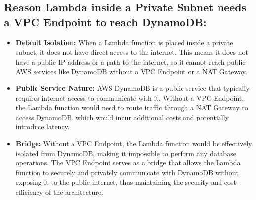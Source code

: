 \subsection{Reason Lambda inside a Private Subnet needs a VPC Endpoint to reach DynamoDB:}
\begin{itemize}
  \item \textbf{Default Isolation:} When a Lambda function is placed inside a private subnet, it does not have direct access to the internet. This means it does not have a public IP address or a path to the internet, so it cannot reach public AWS services like DynamoDB without a VPC Endpoint or a NAT Gateway.
  \item \textbf{Public Service Nature:} AWS DynamoDB is a public service that typically requires internet access to communicate with it. Without a VPC Endpoint, the Lambda function would need to route traffic through a NAT Gateway to access DynamoDB, which would incur additional costs and potentially introduce latency.
  \item \textbf{Bridge:} Without a VPC Endpoint, the Lambda function would be effectively isolated from DynamoDB, making it impossible to perform any database operations. The VPC Endpoint serves as a bridge that allows the Lambda function to securely and privately communicate with DynamoDB without exposing it to the public internet, thus maintaining the security and cost-efficiency of the architecture.
\end{itemize}

